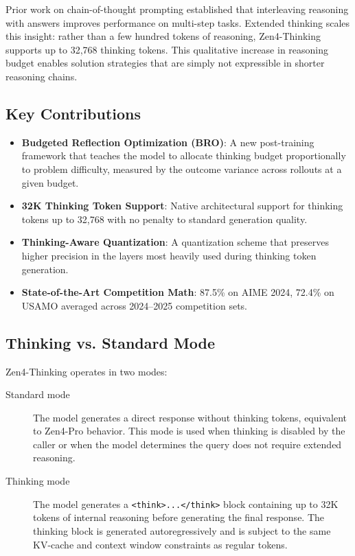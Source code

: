 \documentclass[11pt,a4paper]{article}
\begin{document}
Prior work on chain-of-thought prompting \cite{wei2022chain} established that interleaving
reasoning with answers improves performance on multi-step tasks. Extended thinking scales
this insight: rather than a few hundred tokens of reasoning, Zen4-Thinking supports up to
32,768 thinking tokens. This qualitative increase in reasoning budget enables solution
strategies that are simply not expressible in shorter reasoning chains.

\subsection{Key Contributions}

\begin{itemize}
    \item \textbf{Budgeted Reflection Optimization (BRO)}: A new post-training framework
    that teaches the model to allocate thinking budget proportionally to problem difficulty,
    measured by the outcome variance across rollouts at a given budget.
    \item \textbf{32K Thinking Token Support}: Native architectural support for thinking
    tokens up to 32,768 with no penalty to standard generation quality.
    \item \textbf{Thinking-Aware Quantization}: A quantization scheme that preserves
    higher precision in the layers most heavily used during thinking token generation.
    \item \textbf{State-of-the-Art Competition Math}: 87.5\% on AIME 2024, 72.4\% on USAMO
    averaged across 2024--2025 competition sets.
\end{itemize}

\subsection{Thinking vs. Standard Mode}

Zen4-Thinking operates in two modes:

\begin{description}
    \item[Standard mode] The model generates a direct response without thinking tokens,
    equivalent to Zen4-Pro behavior. This mode is used when thinking is disabled by
    the caller or when the model determines the query does not require extended reasoning.
    \item[Thinking mode] The model generates a \texttt{<think>...</think>} block containing
    up to 32K tokens of internal reasoning before generating the final response. The
    thinking block is generated autoregressively and is subject to the same KV-cache
    and context window constraints as regular tokens.
\end{description}
\end{document}
